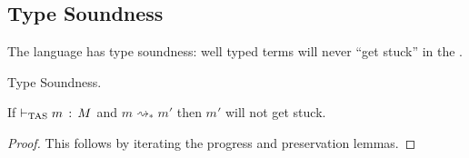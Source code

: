 \subsection{Type Soundness}
 
The language has type soundness: well typed terms will never ``get stuck'' in the \slang{}.

\begin{thm} Type Soundness.
 
If $\vdash_{\mathrm{TAS}} m\,:\,M$ and $m\rightsquigarrow_\ast m'$ then $m'$ will not get stuck.
\end{thm}
\begin{proof}
This follows by iterating the progress and preservation lemmas.
\end{proof}


 
 
 
 
 
 
 
 
 
